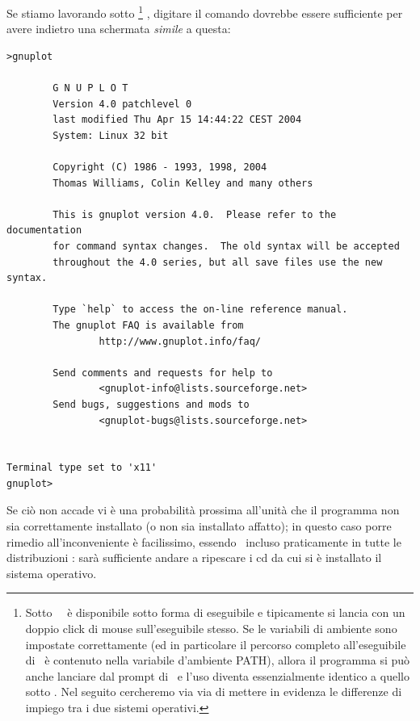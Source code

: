 Se stiamo lavorando sotto \linux%
\footnote{
Sotto \windows\ \gnuplot\ \`e disponibile sotto forma di eseguibile e
tipicamente si lancia con un doppio click di mouse sull'eseguibile stesso.
Se le variabili di ambiente sono impostate correttamente (ed in particolare
il percorso completo all'eseguibile di \gnuplot\ \`e contenuto nella variabile
d'ambiente PATH), allora il programma si pu\`o anche lanciare dal prompt di
\dos\ e l'uso diventa essenzialmente identico a quello sotto \linux.
Nel seguito cercheremo via via di mettere in evidenza le differenze di
impiego tra i due sistemi operativi.
}%
, digitare il comando  dovrebbe essere sufficiente
per avere indietro una schermata \emph{simile} a questa:
\begin{verbatim}
>gnuplot

        G N U P L O T
        Version 4.0 patchlevel 0
        last modified Thu Apr 15 14:44:22 CEST 2004
        System: Linux 32 bit

        Copyright (C) 1986 - 1993, 1998, 2004
        Thomas Williams, Colin Kelley and many others

        This is gnuplot version 4.0.  Please refer to the documentation
        for command syntax changes.  The old syntax will be accepted
        throughout the 4.0 series, but all save files use the new syntax.

        Type `help` to access the on-line reference manual.
        The gnuplot FAQ is available from
                http://www.gnuplot.info/faq/

        Send comments and requests for help to
                <gnuplot-info@lists.sourceforge.net>
        Send bugs, suggestions and mods to
                <gnuplot-bugs@lists.sourceforge.net>


Terminal type set to 'x11'
gnuplot>
\end{verbatim}
Se ci\`o non accade vi \`e una probabilit\`a prossima all'unit\`a che il
programma non sia correttamente installato (o non sia installato affatto);
in questo caso porre rimedio all'inconveniente \`e facilissimo,
essendo \gnuplot\ incluso praticamente in tutte le distribuzioni \linux:
sar\`a sufficiente andare a ripescare i cd da cui si \`e installato il sistema
operativo.

